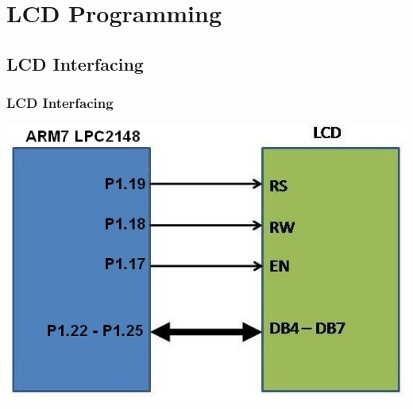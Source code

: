 \documentclass[10pt,red]{beamer}
\begin{document}
\section{LCD Programming}
\subsection{LCD Interfacing}
\begin{frame}
		\frametitle{LCD Interfacing} \pause
		\hspace{1.5cm}\includegraphics[scale=0.60]{lcd_interfacing}
\end{frame}
		
\end{document}
